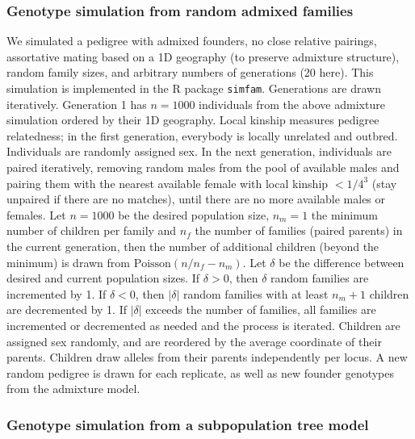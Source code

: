 \documentclass[9pt,lineno]{elife}
\begin{document}
\subsubsection{Genotype simulation from random admixed families}

We simulated a pedigree with admixed founders, no close relative pairings, assortative mating based on a 1D geography (to preserve admixture structure), random family sizes, and arbitrary numbers of generations (20 here).
This simulation is implemented in the R package \texttt{simfam}.
Generations are drawn iteratively.
Generation 1 has $n=1000$ individuals from the above admixture simulation ordered by their 1D geography.
Local kinship measures pedigree relatedness; in the first generation, everybody is locally unrelated and outbred.
Individuals are randomly assigned sex.
In the next generation, individuals are paired iteratively, removing random males from the pool of available males and pairing them with the nearest available female with local kinship $< 1/4^3$ (stay unpaired if there are no matches), until there are no more available males or females.
Let $n=1000$ be the desired population size, $n_m=1$ the minimum number of children per family and $n_f$ the number of families (paired parents) in the current generation, then the number of additional children (beyond the minimum) is drawn from $\text{Poisson}(n/n_f - n_m)$.
Let $\delta$ be the difference between desired and current population sizes.
If $\delta > 0$, then $\delta$ random families are incremented by 1.
If $\delta < 0$, then $|\delta|$ random families with at least $n_m+1$ children are decremented by 1.
If $|\delta|$ exceeds the number of families, all families are incremented or decremented as needed and the process is iterated.
Children are assigned sex randomly, and are reordered by the average coordinate of their parents.
Children draw alleles from their parents independently per locus.
A new random pedigree is drawn for each replicate, as well as new founder genotypes from the admixture model.

\subsubsection{Genotype simulation from a subpopulation tree model}
\end{document}
